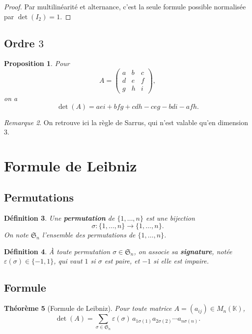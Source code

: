 \documentclass[11pt,a4paper]{article}
\newtheorem{definition}{Définition}[section]
\newtheorem{theoreme}[definition]{Théorème}
\newtheorem{proposition}[definition]{Proposition}
\theoremstyle{remark}
\newtheorem{remarque}[definition]{Remarque}
\newcommand{\K}{\mathbb{K}}
\begin{document}
\begin{proof}
Par multilinéarité et alternance, c’est la seule formule possible normalisée par \(\det(I_2)=1\).
\end{proof}

\subsection{Ordre \(3\)}

\begin{proposition}
Pour
\[
A=
\begin{pmatrix}
a & b & c\\
d & e & f\\
g & h & i
\end{pmatrix},
\]
on a
\[
\det(A)=aei+bfg+cdh-ceg-bdi-afh.
\]
\end{proposition}

\begin{remarque}
On retrouve ici la règle de Sarrus, qui n’est valable qu’en dimension \(3\).
\end{remarque}

\section{Formule de Leibniz}

\subsection{Permutations}

\begin{definition}
Une \textbf{permutation} de \(\{1,\dots,n\}\) est une bijection
\[
\sigma:\{1,\dots,n\}\to\{1,\dots,n\}.
\]
On note \(\mathfrak S_n\) l’ensemble des permutations de \(\{1,\dots,n\}\).
\end{definition}

\begin{definition}
À toute permutation \(\sigma\in\mathfrak S_n\), on associe sa \textbf{signature}, notée \(\varepsilon(\sigma)\in\{-1,1\}\), qui vaut \(1\) si \(\sigma\) est paire, et \(-1\) si elle est impaire.
\end{definition}

\subsection{Formule}

\begin{theoreme}[Formule de Leibniz]
Pour toute matrice \(A=(a_{ij})\in M_n(\K)\),
\[
\det(A)=\sum_{\sigma\in\mathfrak S_n}\varepsilon(\sigma)\,a_{1\sigma(1)}a_{2\sigma(2)}\cdots a_{n\sigma(n)}.
\]
\end{theoreme}
\end{document}
